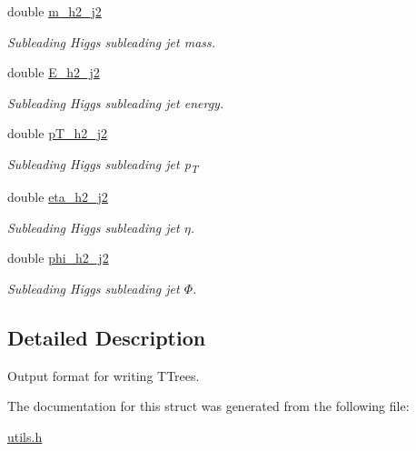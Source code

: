 \begin{DoxyCompactItemize}
\mbox{\label{structout__format_a223fef885a8139cd684dd86c9ad16c08}} 
double \mbox{\hyperlink{structout__format_a223fef885a8139cd684dd86c9ad16c08}{m\+\_\+h2\+\_\+j2}}
\begin{DoxyCompactList}\small\item\em Subleading Higgs subleading jet mass. \end{DoxyCompactList}\item 
\mbox{\label{structout__format_aef9cdef21b8a9febb626ee11c7358513}} 
double \mbox{\hyperlink{structout__format_aef9cdef21b8a9febb626ee11c7358513}{E\+\_\+h2\+\_\+j2}}
\begin{DoxyCompactList}\small\item\em Subleading Higgs subleading jet energy. \end{DoxyCompactList}\item 
\mbox{\label{structout__format_a8167b3c3ba85f0ebe297411ff5a7c218}} 
double \mbox{\hyperlink{structout__format_a8167b3c3ba85f0ebe297411ff5a7c218}{p\+T\+\_\+h2\+\_\+j2}}
\begin{DoxyCompactList}\small\item\em Subleading Higgs subleading jet p\textsubscript{T} \end{DoxyCompactList}\item 
\mbox{\label{structout__format_adcc57be23e396a631c2d587725137cdc}} 
double \mbox{\hyperlink{structout__format_adcc57be23e396a631c2d587725137cdc}{eta\+\_\+h2\+\_\+j2}}
\begin{DoxyCompactList}\small\item\em Subleading Higgs subleading jet {$\eta$}. \end{DoxyCompactList}\item 
\mbox{\label{structout__format_aee3b46a741abf3854aea6166c7c48965}} 
double \mbox{\hyperlink{structout__format_aee3b46a741abf3854aea6166c7c48965}{phi\+\_\+h2\+\_\+j2}}
\begin{DoxyCompactList}\small\item\em Subleading Higgs subleading jet {$\Phi$}. \end{DoxyCompactList}\end{DoxyCompactItemize}


\subsection{Detailed Description}
Output format for writing T\+Trees. 

The documentation for this struct was generated from the following file\+:\begin{DoxyCompactItemize}
\item 
\mbox{\hyperlink{utils_8h}{utils.\+h}}\end{DoxyCompactItemize}
